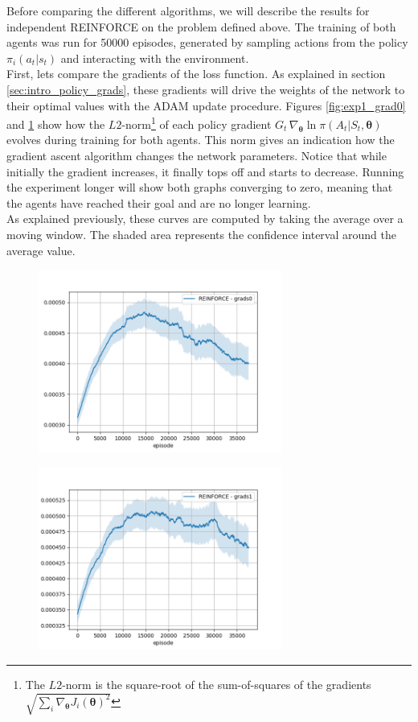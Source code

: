 Before comparing the different algorithms, we will describe the results for independent REINFORCE on the problem defined above. The training of both agents was run for 50000 episodes, generated by sampling actions from the policy $\pi_i(a_t|s_t)$ and interacting with the environment.\\
First, lets compare the gradients of the loss function. As explained in section \ref{sec:intro_policy_grads}, these gradients will drive the weights of the network to their optimal values with the ADAM update procedure. Figures \ref{fig:exp1_grad0} and \ref{fig:exp1_grad1} show how the $L2$-norm\footnote{The $L2$-norm is the square-root of the sum-of-squares of the gradients $\sqrt{\sum_i \nabla_{\bm{\theta}} J_{i}(\bm{\theta})^2}$}  of each policy gradient $G_t \, \nabla_{\bm{\theta}} \ln \pi(A_t|S_t,\bm{\theta})$ evolves during training for both agents. This norm gives an indication how the gradient ascent algorithm changes the network parameters. Notice that while initially the gradient increases, it finally tops off and starts to decrease. Running the experiment longer will show both graphs converging to zero, meaning that the agents have reached their goal and are no longer learning.\\
As explained previously, these curves are computed by taking the average over a moving window. The shaded area represents the confidence interval around the average value.
\begin{figure}
\centering
\begin{minipage}{.5\textwidth}
  \centering
  \includegraphics[width=8cm]{images/experiment4/grad0.png}
  \label{fig:exp1_grad0}
\end{minipage}%
\begin{minipage}{.5\textwidth}
  \centering
  \includegraphics[width=8cm]{images/experiment4/grad1.png}
  \label{fig:exp1_grad1}
\end{minipage}
\end{figure}

